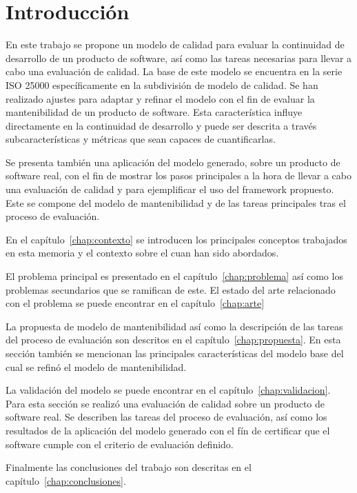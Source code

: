 \chapter{Introducción}
En este trabajo se propone un modelo de calidad para evaluar la continuidad
de desarrollo de un producto de software, así como las tareas necesarias
para llevar a cabo una evaluación de calidad.
La base de este modelo se encuentra en la serie ISO 25000
específicamente en la subdivisión de modelo de calidad.
Se han realizado ajustes para adaptar y refinar el modelo con el fin de evaluar la mantenibilidad de un producto de software.
Esta característica influye directamente en la continuidad de desarrollo y puede
ser descrita a través subcaracterísticas y métricas que sean capaces de cuantificarlas.

Se presenta también una aplicación del modelo generado, sobre un producto de software
real, con el fin de mostrar los pasos principales a la hora de llevar a cabo
una evaluación de calidad y para ejemplificar el uso del framework propuesto. Este se compone
del modelo de mantenibilidad y de las tareas principales tras el proceso de evaluación.

En el capítulo~\ref{chap:contexto} se introducen los principales conceptos trabajados
en esta memoria y el contexto sobre el cuan han sido abordados.

El problema principal es presentado en el capítulo~\ref{chap:problema} así como
los problemas secundarios que se ramifican de este. El estado del arte relacionado
con el problema se puede encontrar en el capítulo~\ref{chap:arte}

La propuesta de modelo de mantenibilidad así como la descripción de las tareas del proceso
de evaluación son descritos en el capítulo~\ref{chap:propuesta}. En esta sección
también se mencionan las principales características del modelo base del cual
se refinó el modelo de mantenibilidad.

La validación del modelo se puede encontrar en el capítulo~\ref{chap:validacion}.
Para esta sección se realizó una evaluación de calidad sobre un producto de software
real. Se describen las tareas del proceso de evaluación, así como los resultados
de la aplicación del modelo generado con el fín de certificar que el software
cumple con el criterio de evaluación definido.

Finalmente las conclusiones del trabajo son descritas en el capítulo~\ref{chap:conclusiones}.
